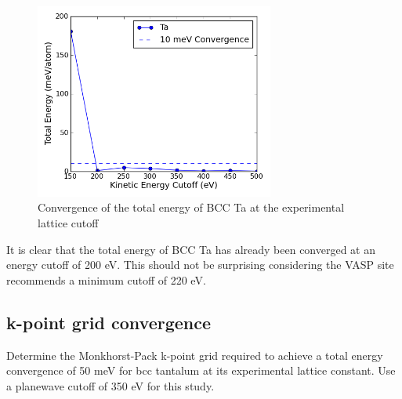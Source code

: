 \documentclass[11pt]{article}
\begin{document}
\begin{figure}[H]
\centering
\includegraphics[width=0.7\textwidth]{./1-1.png}
\caption{Convergence of the total energy of BCC Ta at the experimental lattice cutoff}
\end{figure}

It is clear that the total energy of BCC Ta has already been converged at an energy cutoff of 200 eV. This should not be surprising considering the VASP site recommends a minimum cutoff of 220 eV.
\subsection{k-point grid convergence}
\label{sec-1-2}

Determine the Monkhorst-Pack k-point grid required to achieve a total energy convergence of 50 meV for bcc tantalum at its experimental lattice constant. Use a planewave cutoff of 350 eV for this study.
\end{document}
